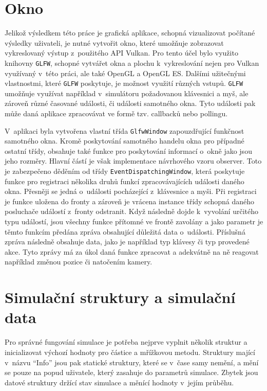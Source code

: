 \section{Okno}
\label{chapter:okno}
Jelikož výsledkem této práce je grafická aplikace, schopná vizualizovat počítané výsledky uživateli, je nutné vytvořit okno, které umožňuje zobrazovat vykreslovaný výstup z~použitého API Vulkan. Pro tento účel bylo využito knihovny \texttt{GLFW}, schopné vytvářet okna a plochu k~vykreslování nejen pro Vulkan využívaný v~této práci, ale také OpenGL a OpenGL ES. Dalšími užitečnými vlastnostmi, které \texttt{GLFW} poskytuje, je možnost využití různých vstupů. \texttt{GLFW} umožňuje využívat například v~simulátoru požadovanou klávesnici a myš, ale zároveň různé časované události, či události samotného okna. Tyto události pak může daná aplikace zpracovávat ve formě tzv. callbacků nebo pollingu. 

V~aplikaci byla vytvořena vlastní třída \texttt{GlfwWindow} zapouzdřující funkčnost samotného okna. Kromě poskytování samotného handelu okna pro případné ostatní třídy, obsahuje také funkce pro poskytování informací o~okně jako jsou jeho rozměry. Hlavní částí je však implementace návrhového vzoru observer. Toto je zabezpečeno děděním od třídy \texttt{EventDispatchingWindow}, která poskytuje funkce pro registraci několika druhů funkcí zpracovávajících události daného okna. Přesněji se jedná o~události pocházející z~klávesnice a myši. Při registraci je funkce uložena do fronty a zároveň je vrácena instance třídy schopná daného posluchače událostí z~fronty odstranit. Když následně dojde k~vyvolání určitého typu událostí, jsou všechny funkce přítomné ve frontě zavolány a jako parametr je těmto funkcím předána zpráva obsahující důležitá data o~události. Příslušná zpráva následně obsahuje data, jako je například typ klávesy či typ provedené akce. Tyto zprávy má za úkol daná funkce zpracovat a adekvátně na ně reagovat například změnou pozice či natočením kamery.


\section{Simulační struktury a simulační data}
\label{chapter:simStructData}
Pro správné fungování simulace je potřeba nejprve vyplnit několik struktur a inicializovat výchozí hodnoty pro částice a mřížkovou metodu. Struktury mající v~názvu \enquote{Info} jsou pak statické struktury, které se v~čase samy nemění, a mění se pouze na popud uživatele, který zasahuje do parametrů simulace. Zbytek jsou datové struktury držící stav simulace a měnící hodnoty v~jejím průběhu.

